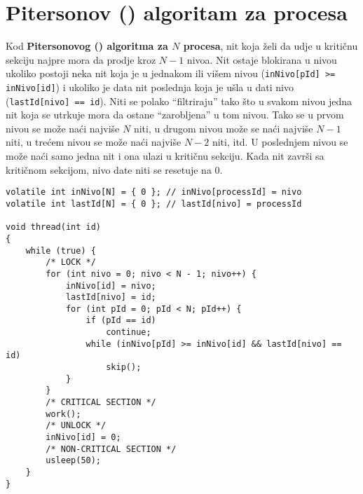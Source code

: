 \clearpage
\section{Pitersonov () algoritam za  procesa}
Kod \textbf{Pitersonovog () algoritma za $N$ procesa}, nit koja \v{z}eli da udje u kriti\v{c}nu sekciju najpre mora da prodje kroz $N - 1$ nivoa. Nit ostaje blokirana u nivou ukoliko postoji neka nit koja je u jednakom ili vi\v{s}em nivou (\texttt{inNivo[pId] >= inNivo[id]}) i ukoliko je data nit poslednja koja je u\v{s}la u dati nivo (\texttt{lastId[nivo] == id}). Niti se polako ``filtriraju'' tako \v{s}to u svakom nivou jedna nit koja se utrkuje mora da ostane ``zarobljena'' u tom nivou. Tako se u prvom nivou se mo\v{z}e na\'{c}i najvi\v{s}e $N$ niti, u drugom nivou mo\v{z}e se na\'{c}i najvi\v{s}e $N-1$ niti, u tre\'{c}em nivou se mo\v{z}e na\'{c}i najvi\v{s}e $N-2$ niti, itd. U poslednjem nivou se mo\v{z}e na\'{c}i samo jedna nit i ona ulazi u kriti\v{c}nu sekciju. Kada nit zavr\v{s}i sa kriti\v{c}nom sekcijom, nivo date niti se resetuje na 0.
\begin{lstlisting}
volatile int inNivo[N] = { 0 }; // inNivo[processId] = nivo
volatile int lastId[N] = { 0 }; // lastId[nivo] = processId

void thread(int id)
{
    while (true) {
		/* LOCK */
        for (int nivo = 0; nivo < N - 1; nivo++) {
            inNivo[id] = nivo;
            lastId[nivo] = id;
            for (int pId = 0; pId < N; pId++) {
                if (pId == id)
                    continue;
                while (inNivo[pId] >= inNivo[id] && lastId[nivo] == id) 
                    skip();
            }
        }
		/* CRITICAL SECTION */
        work();
		/* UNLOCK */
        inNivo[id] = 0;
		/* NON-CRITICAL SECTION */
        usleep(50);
    }
}
\end{lstlisting}